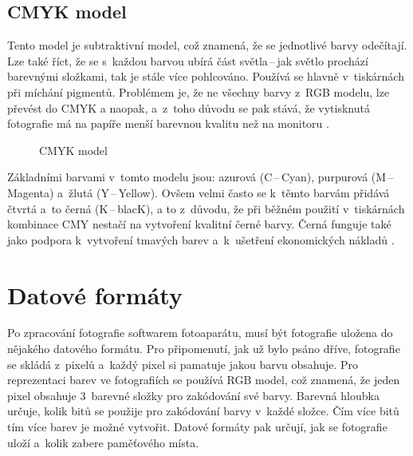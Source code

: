 \subsection*{CMYK model}
Tento model je subtraktivní model, což znamená, že se jednotlivé barvy odečítají. Lze také říct, že se s~každou barvou ubírá část světla\,--\,jak světlo prochází barevnými složkami, tak je stále více pohlcováno. Používá se hlavně v~tiskárnách při míchání pigmentů. Problémem je, že ne všechny barvy z~RGB modelu, lze převést do CMYK a naopak, a~z~toho důvodu se pak stává, že vytisknutá fotografie má na papíře menší barevnou kvalitu než na monitoru \cite{barvy}.

\begin{figure}[hb]
\begin{center}
\caption{CMYK model\cite{rgb_monitor}}
\label{cmyk_obraz}
\end{center}
\end{figure}

Základními barvami v~tomto modelu jsou: azurová (C\,--\,Cyan), purpurová (M\,--\,Magenta) a~žlutá (Y\,--\,Yellow). Ovšem velmi často se k~těmto barvám přidává čtvrtá a~to černá (K\,--\,blacK), a to z~důvodu, že při běžném použití v~tiskárnách kombinace CMY nestačí na vytvoření kvalitní černé barvy. Černá funguje také jako podpora k~vytvoření tmavých barev a~k~ušetření ekonomických nákladů \cite{rgb_monitor}.

\section{Datové formáty}
Po zpracování fotografie softwarem fotoaparátu, musí být fotografie uložena do nějakého datového formátu. Pro připomenutí, jak už bylo psáno dříve, fotografie se skládá z~pixelů a~každý pixel si pamatuje jakou barvu obsahuje. Pro reprezentaci barev ve fotografiích se používá RGB model, což znamená, že jeden pixel obsahuje 3~barevné složky pro zakódování své barvy. Barevná hloubka určuje, kolik bitů se použije pro zakódování barvy v~každé složce. Čím více bitů tím více barev je možné vytvořit. Datové formáty pak určují, jak se fotografie uloží a~kolik zabere paměťového místa.

